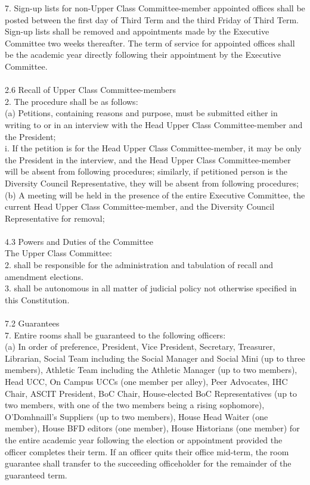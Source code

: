 \documentclass[10pt]{article} %
\begin{document}
\begin{itemize}
        7. Sign-up lists for non-Upper Class Committee-member appointed offices shall be posted between the first day of Third Term and the third Friday of Third Term. Sign-up lists shall be removed and appointments made by the Executive Committee two weeks thereafter. The term of service for appointed offices shall be the academic year directly following their appointment by the Executive Committee. \\ \\
        2.6 Recall of Upper Class Committee-members \\
        2. The procedure shall be as follows: \\
        (a) Petitions, containing reasons and purpose, must be submitted either in writing to or in an interview with the Head Upper Class Committee-member and the President; \\
        i. If the petition is for the Head Upper Class Committee-member, it may be only the President in the interview, and the Head Upper Class Committee-member will be absent from following procedures; similarly, if petitioned person is the Diversity Council Representative, they will be absent from following procedures; \\
        (b) A meeting will be held in the presence of the entire Executive Committee, the current Head Upper Class Committee-member, and the Diversity Council Representative for removal; \\ \\
        4.3 Powers and Duties of the Committee \\
        The Upper Class Committee: \\
        2. shall be responsible for the administration and tabulation of recall and amendment elections. \\
        3. shall be autonomous in all matter of judicial policy not otherwise specified in this Constitution. \\ \\
        7.2 Guarantees \\
        7. Entire rooms shall be guaranteed to the following officers: \\
        (a) In order of preference, President, Vice President, Secretary, Treasurer, Librarian, Social Team including the Social Manager and Social Mini (up to three members), Athletic Team including the Athletic Manager (up to two members), Head UCC, On Campus UCCs (one member per alley), Peer Advocates, IHC Chair, ASCIT President, BoC Chair, House-elected BoC Representatives (up to two members, with one of the two members being a rising sophomore), O'Domhnaill's Suppliers (up to two members), House Head Waiter (one member), House BFD editors (one member), House Historians (one member) for the entire academic year following the election or appointment provided the officer completes their term. If an officer quits their office mid-term, the room guarantee shall transfer to the succeeding officeholder for the remainder of the guaranteed term. \\

\end{itemize}
\end{document}
